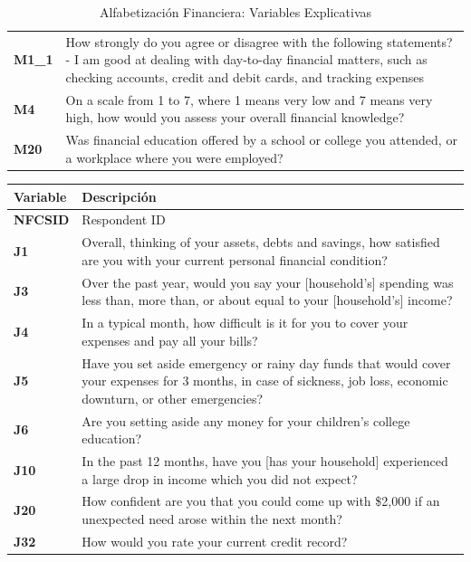 \documentclass[a4paper, 11pt]{article}
\begin{document}
\begin{table}
\begin{tabular}{>{\RaggedRight\hspace{0pt}}m{2cm} >{\RaggedRight\hspace{0pt}}m{11cm}}
\textbf{M1\_1} & How strongly do you agree or disagree with the following statements? - I am good at dealing with day-to-day financial matters, such as checking accounts, credit and debit cards, and tracking expenses \\
\textbf{M4} & On a scale from 1 to 7, where 1 means very low and 7 means very high, how would you assess your overall financial knowledge? \\
\textbf{M20} & Was financial education offered by a school or college you attended, or a workplace where you were employed?\\
\bottomrule
\end{tabular}
\caption{Alfabetización Financiera: Variables Explicativas}
\label{table:capabilities_features}
\end{table}

\begin{table}
\centering
\footnotesize
\begin{tabular}{>{\RaggedRight\hspace{0pt}}m{2cm} >{\RaggedRight\hspace{0pt}}m{11cm}}
\toprule
\textbf{Variable} & \textbf{Descripción}\\
\midrule
\textbf{NFCSID} & Respondent ID \\
\textbf{J1} & Overall, thinking of your assets, debts and savings, how satisfied are you with your current personal financial condition?  \\
\textbf{J3} & Over the past year, would you say your [household's] spending was less than, more than, or about equal to your [household's] income?  \\
\textbf{J4} & In a typical month, how difficult is it for you to cover your expenses and pay all your bills?  \\
\textbf{J5} & Have you set aside emergency or rainy day funds that would cover your expenses for 3 months, in case of sickness, job loss, economic downturn, or other emergencies?  \\
\textbf{J6} & Are you setting aside any money for your children's college education?\\
\textbf{J10} & In the past 12 months, have you [has your household] experienced a large drop in income which you did not expect? \\
\textbf{J20} & How confident are you that you could come up with \$2,000 if an unexpected need arose within the next month?  \\
\textbf{J32} & How would you rate your current credit record? \\

\end{tabular}
\end{table}
\end{document}
